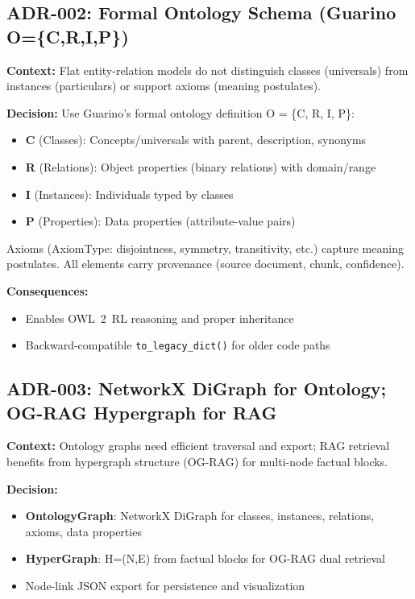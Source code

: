 \documentclass[11pt,a4paper]{article}
\begin{document}
\subsection{ADR-002: Formal Ontology Schema (Guarino O=\{C,R,I,P\})}
\label{sec:adr-schema}

\textbf{Context:} Flat entity-relation models do not distinguish classes (universals) from instances (particulars) or support axioms (meaning postulates).

\textbf{Decision:} Use Guarino's formal ontology definition O = \{C, R, I, P\}:
\begin{itemize}
    \item \textbf{C} (Classes): Concepts/universals with parent, description, synonyms
    \item \textbf{R} (Relations): Object properties (binary relations) with domain/range
    \item \textbf{I} (Instances): Individuals typed by classes
    \item \textbf{P} (Properties): Data properties (attribute-value pairs)
\end{itemize}

Axioms (AxiomType: disjointness, symmetry, transitivity, etc.) capture meaning postulates. All elements carry provenance (source document, chunk, confidence).

\textbf{Consequences:}
\begin{itemize}
    \item Enables OWL~2~RL reasoning and proper inheritance
    \item Backward-compatible \texttt{to\_legacy\_dict()} for older code paths
\end{itemize}

\subsection{ADR-003: NetworkX DiGraph for Ontology; OG-RAG Hypergraph for RAG}
\label{sec:adr-graph}

\textbf{Context:} Ontology graphs need efficient traversal and export; RAG retrieval benefits from hypergraph structure (OG-RAG) for multi-node factual blocks.

\textbf{Decision:}
\begin{itemize}
    \item \textbf{OntologyGraph}: NetworkX DiGraph for classes, instances, relations, axioms, data properties
    \item \textbf{HyperGraph}: H=(N,E) from factual blocks for OG-RAG dual retrieval
    \item Node-link JSON export for persistence and visualization
\end{itemize}
\end{document}
